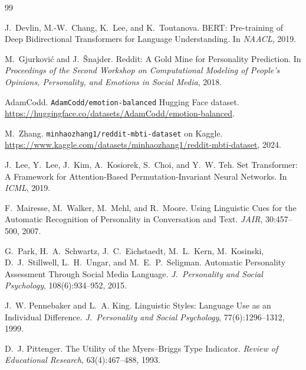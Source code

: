 \documentclass{article}
\begin{document}
{\small

\begin{thebibliography}{99}

J.~Devlin, M.-W.~Chang, K.~Lee, and K.~Toutanova.
\newblock BERT: Pre-training of Deep Bidirectional Transformers for Language Understanding.
\newblock In \emph{NAACL}, 2019.

M.~Gjurkovi\'c and J.~\v{S}najder.
\newblock Reddit: A Gold Mine for Personality Prediction.
\newblock In \emph{Proceedings of the Second Workshop on Computational Modeling of People's Opinions, Personality, and Emotions in Social Media}, 2018.

AdamCodd.
\newblock \texttt{AdamCodd/emotion-balanced} Hugging Face dataset.
\newblock \url{https://huggingface.co/datasets/AdamCodd/emotion-balanced}.

M.~Zhang.
\newblock \texttt{minhaozhang1/reddit-mbti-dataset} on Kaggle.
\newblock \url{https://www.kaggle.com/datasets/minhaozhang1/reddit-mbti-dataset}, 2024.

J.~Lee, Y.~Lee, J.~Kim, A.~Kosiorek, S.~Choi, and Y.~W. Teh.
\newblock Set Transformer: A Framework for Attention-Based Permutation-Invariant Neural Networks.
\newblock In \emph{ICML}, 2019.

F.~Mairesse, M.~Walker, M.~Mehl, and R.~Moore.
\newblock Using Linguistic Cues for the Automatic Recognition of Personality in Conversation and Text.
\newblock \emph{JAIR}, 30:457--500, 2007.

G.~Park, H.~A.~Schwartz, J.~C.~Eichstaedt, M.~L.~Kern, M.~Kosinski, D.~J.~Stillwell, L.~H.~Ungar, and M.~E.~P.~Seligman.
\newblock Automatic Personality Assessment Through Social Media Language.
\newblock \emph{J.\ Personality and Social Psychology}, 108(6):934--952, 2015.

J.~W. Pennebaker and L.~A. King.
\newblock Linguistic Styles: Language Use as an Individual Difference.
\newblock \emph{J.\ Personality and Social Psychology}, 77(6):1296--1312, 1999.

D.~J. Pittenger.
\newblock The Utility of the Myers--Briggs Type Indicator.
\newblock \emph{Review of Educational Research}, 63(4):467--488, 1993.


\end{thebibliography}}
\end{document}
